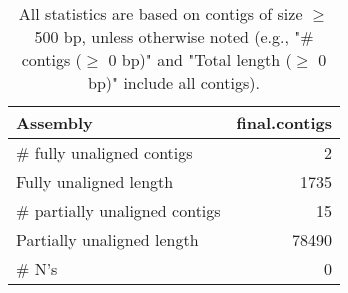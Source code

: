 \documentclass[12pt,a4paper]{article}
\begin{document}
\begin{table}[ht]
\begin{center}
\caption{All statistics are based on contigs of size $\geq$ 500 bp, unless otherwise noted (e.g., "\# contigs ($\geq$ 0 bp)" and "Total length ($\geq$ 0 bp)" include all contigs).}
\begin{tabular}{|l*{1}{|r}|}
\hline
Assembly & final.contigs \\ \hline
\# fully unaligned contigs & 2 \\ \hline
Fully unaligned length & 1735 \\ \hline
\# partially unaligned contigs & 15 \\ \hline
Partially unaligned length & 78490 \\ \hline
\# N's & 0 \\ \hline
\end{tabular}
\end{center}
\end{table}
\end{document}
